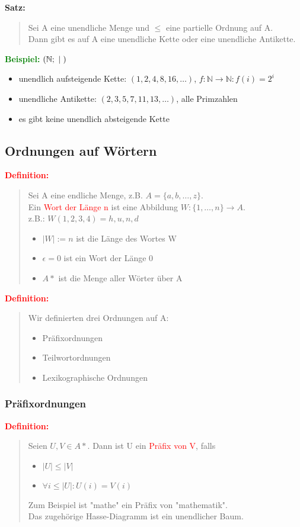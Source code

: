 \documentclass{article}
\newcommand{\smsp}{\phantom{\hspace{3px}}}
\newcommand{\red}[1]{\textcolor{red}{#1}}
\newcommand{\green}[1]{\textcolor{green}{#1}}
\newcommand{\dgr}[1]{\textcolor{dgr}{#1}}
\newcommand{\ex}{\green{\textbf{Beispiel: }}}
\newcommand{\de}[1]{\red{\textbf{Definition: }}\begin{quote}#1\end{quote}}
\newcommand{\se}[1]{\dgr{\textbf{Satz: }}\begin{quote}#1\end{quote}}
\newcommand{\N}{\mathbb{N}}
\renewcommand{\st}{\smsp | \smsp}
\begin{document}
\se{
    Sei A eine unendliche Menge und $\le$ eine partielle Ordnung auf A.\\
    Dann gibt es auf A eine unendliche Kette oder eine unendliche Antikette.
}

\ex $(\N; \st)$
\begin{itemize}
    \item unendlich aufsteigende Kette: $(1,2,4,8,16,\dots)$, $f: \N \to \N: f(i) = 2^i$
    \item unendliche Antikette: $(2,3,5,7,11,13,\dots)$, alle Primzahlen
    \item es gibt keine unendlich absteigende Kette
\end{itemize}

\subsection{Ordnungen auf Wörtern}

\de{
    Sei A eine endliche Menge, z.B. $A = \{a,b,\dots,z\}$.\\
    Ein \red{Wort der Länge n} ist eine Abbildung $W: \{1, \dots, n\} \to A$.\\
    z.B.: $W(1,2,3,4) = h,u,n,d$
    \begin{itemize}
        \item $|W| := n$ ist die Länge des Wortes W
        \item $\epsilon = 0$ ist ein Wort der Länge 0
        \item $A*$ ist die Menge aller Wörter über A
    \end{itemize} 
}

\de{
    Wir definierten drei Ordnungen auf A:
    \begin{itemize}
        \item Präfixordnungen
        \item Teilwortordnungen
        \item Lexikographische Ordnungen
    \end{itemize}
}

\subsubsection{Präfixordnungen}

\de{
    Seien $U,V \in A*$. Dann ist U ein \red{Präfix von V}, falls
    \begin{itemize}
        \item $|U| \le |V|$
        \item $\forall i \le |U|: U(i) = V(i)$
    \end{itemize}
    Zum Beispiel ist "mathe" ein Präfix von "mathematik".\\
    Das zugehörige Hasse-Diagramm ist ein unendlicher Baum.
}
\end{document}
